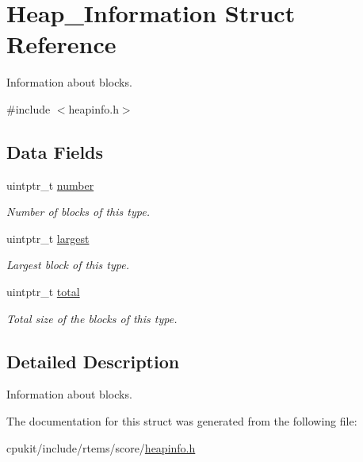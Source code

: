 \hypertarget{structHeap__Information}{}\section{Heap\+\_\+\+Information Struct Reference}
\label{structHeap__Information}


Information about blocks.  




{\ttfamily \#include $<$heapinfo.\+h$>$}

\subsection*{Data Fields}
\begin{DoxyCompactItemize}
\item 
\mbox{\label{structHeap__Information_ad07ac14e209ff6acf6fe64ed2319bb13}} 
uintptr\+\_\+t \mbox{\hyperlink{structHeap__Information_ad07ac14e209ff6acf6fe64ed2319bb13}{number}}
\begin{DoxyCompactList}\small\item\em Number of blocks of this type. \end{DoxyCompactList}\item 
\mbox{\label{structHeap__Information_a4b429f0e5c65f3553d36506f56c56243}} 
uintptr\+\_\+t \mbox{\hyperlink{structHeap__Information_a4b429f0e5c65f3553d36506f56c56243}{largest}}
\begin{DoxyCompactList}\small\item\em Largest block of this type. \end{DoxyCompactList}\item 
\mbox{\label{structHeap__Information_a0f97bbeebbda60daf6c8fbe870b67dac}} 
uintptr\+\_\+t \mbox{\hyperlink{structHeap__Information_a0f97bbeebbda60daf6c8fbe870b67dac}{total}}
\begin{DoxyCompactList}\small\item\em Total size of the blocks of this type. \end{DoxyCompactList}\end{DoxyCompactItemize}


\subsection{Detailed Description}
Information about blocks. 

The documentation for this struct was generated from the following file\+:\begin{DoxyCompactItemize}
\item 
cpukit/include/rtems/score/\mbox{\hyperlink{heapinfo_8h}{heapinfo.\+h}}\end{DoxyCompactItemize}
